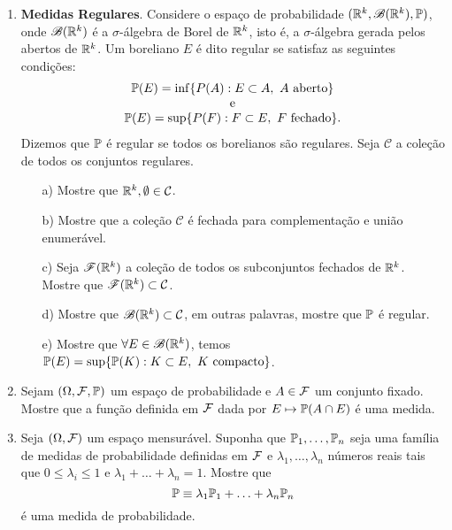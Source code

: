 \begin{enumerate}[leftmargin=*]
\item 
{\bf Medidas Regulares}. 
Considere o espaço de probabilidade
$(\R^k,\mathscr{B}(\R^k),\P)$, onde 
$\mathscr{B}(\R^k)$ é a $\sigma$-álgebra de Borel 
de $\R^k$, isto é, a $\sigma$-álgebra gerada pelos 
abertos de $\R^k$.
Um boreliano $E$ é dito regular se satisfaz as seguintes
condições:
\[
\begin{array}{c}
\P(E) = \inf\{P(A): E\subset A,\ A\ \text{aberto} \}
\\
\text{e}
\\
\P(E) = \sup\{P(F): F\subset E,\ F\ \text{fechado} \}.
\end{array}
\]
Dizemos que $\P$ é regular se todos os borelianos são 
regulares. Seja $\mathcal{C}$ a coleção de todos os
conjuntos regulares.
	\begin{itemize}
	\item[a)]
	Mostre que $\R^k,\emptyset\in \mathcal{C}$.
	
	\item[b)]
	Mostre que a coleção $\mathcal{C}$ é fechada 
	para complementação e união enumerável.
	
	\item[c)]
	Seja $\mathscr{F}(\R^k)$ a coleção de todos os 
	subconjuntos fechados de $\R^k$. Mostre que 
	$\mathscr{F}(\R^k)\subset \mathcal{C}$.
	
	\item[d)]
	Mostre que $\mathscr{B}(\R^k)\subset \mathcal{C}$, em outras palavras,
	mostre que $\P$ é regular.
	
	\item[e)] 
	Mostre que $\forall E\in\mathscr{B}(\R^k)$, temos
	$\P(E) = \sup\{ \P(K): K\subset E,\ K\ \text{compacto}\}$.
	\end{itemize}








\item Sejam $(\Omega,\F,\P)$ um espaço de probabilidade
e $A\in\F$ um conjunto fixado. Mostre que a função 
definida em $\F$ dada por $E\mapsto \P(A\cap E)$ é uma medida.


\item Seja $(\Omega,\F)$ um espaço mensurável. 
Suponha que $\P_1,\ldots, \P_n$ seja uma família 
de medidas de probabilidade definidas em $\F$ e 
$\lambda_1,\ldots,\lambda_n$ números reais tais que 
$0\leq \lambda_i\leq 1$ e $\lambda_1+\ldots+\lambda_n=1$.
Mostre que 
	\[
		\P\equiv \lambda_1\P_1+\ldots +\lambda_n\P_n
	\]
é uma medida de probabilidade.







\end{enumerate}
